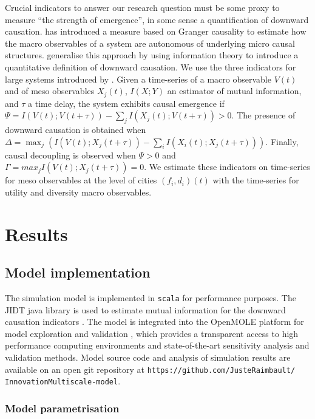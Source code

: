 \documentclass[letterpaper]{article}
\begin{document}
Crucial indicators to answer our research question must be some proxy to measure ``the strength of emergence'', in some sense a quantification of downward causation. \cite{seth2010measuring} has introduced a measure based on Granger causality to estimate how the macro observables of a system are autonomous of underlying micro causal structures. \cite{rosas2020reconciling} generalise this approach by using information theory to introduce a quantitative definition of downward causation. We use the three indicators for large systems introduced by \cite{rosas2020reconciling}. Given a time-series of a macro observable $V(t)$ and of meso observables $X_j(t)$, $I(X;Y)$ an estimator of mutual information, and $\tau$ a time delay, the system exhibits causal emergence if $\Psi = I(V(t); V(t+\tau)) - \sum_j I(X_j(t) ; V(t+\tau)) > 0$. The presence of downward causation is obtained when $\Delta = \max_j \left(I(V(t) ; X_j(t+\tau)) - \sum_i I(X_i (t) ; X_j(t+\tau)) \right)$. Finally, causal decoupling is observed when $\Psi > 0$ and $\Gamma = max_j I(V(t) ; X_j (t + \tau)) = 0$. We estimate these indicators on time-series for meso observables at the level of cities $(f_i,d_i)(t)$ with the time-series for utility and diversity macro observables.


\section{Results}


\subsection{Model implementation}

The simulation model is implemented in \texttt{scala} for performance purposes. The JIDT java library is used to estimate mutual information for the downward causation indicators \citep{lizier2014jidt}. The model is integrated into the OpenMOLE platform for model exploration and validation \citep{reuillon2013openmole}, which provides a transparent access to high performance computing environments and state-of-the-art sensitivity analysis and validation methods. Model source code and analysis of simulation results are available on an open git repository at \texttt{https://github.com/JusteRaimbault/}\\\texttt{InnovationMultiscale-model}.


\subsubsection{Model parametrisation}
\end{document}
